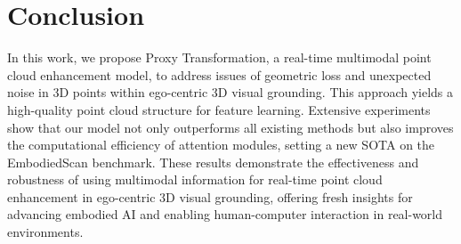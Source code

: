\section{Conclusion}
In this work, we propose Proxy Transformation, a real-time multimodal point cloud enhancement model, to address issues of geometric loss and unexpected noise in 3D points within ego-centric 3D visual grounding. This approach yields a high-quality point cloud structure for feature learning. Extensive experiments show that our model not only outperforms all existing methods but also improves the computational efficiency of attention modules, setting a new SOTA on the EmbodiedScan benchmark.
These results demonstrate the effectiveness and robustness of using multimodal information for real-time point cloud enhancement in ego-centric 3D visual grounding, offering fresh insights for advancing embodied AI and enabling human-computer interaction in real-world environments.

